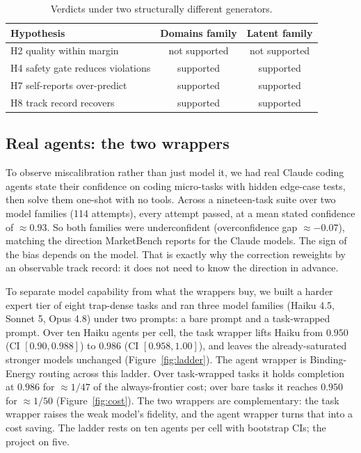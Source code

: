 \documentclass[11pt]{article}
\begin{document}
\begin{table}[h]
\centering\small
\caption{Verdicts under two structurally different generators.}
\label{tab:robust}
\begin{tabular}{@{}lcc@{}}
\toprule
\textbf{Hypothesis} & \textbf{Domains family} & \textbf{Latent family} \\
\midrule
H2 quality within margin & not supported & not supported \\
H4 safety gate reduces violations & supported & supported \\
H7 self-reports over-predict & supported & supported \\
H8 track record recovers & supported & supported \\
\bottomrule
\end{tabular}
\end{table}

\subsection{Real agents: the two wrappers}
To observe miscalibration rather than just model it, we had real Claude coding agents state their confidence on coding micro-tasks with hidden edge-case tests, then solve them one-shot with no tools. Across a nineteen-task suite over two model families (114 attempts), every attempt passed, at a mean stated confidence of $\approx 0.93$. So both families were underconfident (overconfidence gap $\approx -0.07$), matching the direction MarketBench reports for the Claude models. The sign of the bias depends on the model. That is exactly why the correction reweights by an observable track record: it does not need to know the direction in advance.

To separate model capability from what the wrappers buy, we built a harder expert tier of eight trap-dense tasks and ran three model families (Haiku 4.5, Sonnet 5, Opus 4.8) under two prompts: a bare prompt and a task-wrapped prompt. Over ten Haiku agents per cell, the task wrapper lifts Haiku from $0.950$ (CI $[0.90,0.988]$) to $0.986$ (CI $[0.958,1.00]$), and leaves the already-saturated stronger models unchanged (Figure~\ref{fig:ladder}). The agent wrapper is Binding-Energy routing across this ladder. Over task-wrapped tasks it holds completion at $0.986$ for $\approx 1/47$ of the always-frontier cost; over bare tasks it reaches $0.950$ for $\approx 1/50$ (Figure~\ref{fig:cost}). The two wrappers are complementary: the task wrapper raises the weak model's fidelity, and the agent wrapper turns that into a cost saving. The ladder rests on ten agents per cell with bootstrap CIs; the project on five.
\end{document}
